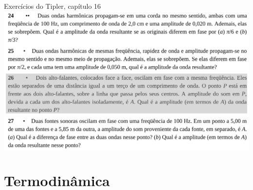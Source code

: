 \documentclass[t,%
brazilian,%
11pt,%
aspectratio=169,%
table%
]{beamer}
\begin{document}
\begin{frame}{Exercícios do Tipler, capítulo 16}
    \centering
    \includegraphics[height=\textheight-28pt]{images/Captura de tela de 2024-01-30 10-31-40.png}
\end{frame}


\section{Termodinâmica}
\end{document}
